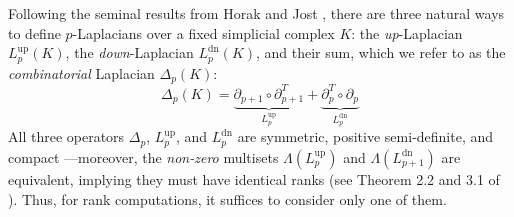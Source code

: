\documentclass[pdflatex,sn-mathphys-num]{sn-jnl}
\begin{document}
Following the seminal results from Horak and Jost \cite{horak2013spectra}, there are three natural ways to define \(p\)-Laplacians over a fixed simplicial complex \(K\): the \emph{up}-Laplacian \(L_{p}^{\operatorname{up}}(K)\), the \emph{down}-Laplacian \(L_{p}^{\operatorname{dn}}(K)\), and their sum, which we refer to as the \emph{combinatorial} Laplacian \(\Delta_{p}(K)\):
\[\label{eq:comb_lap}
\Delta_{p}(K) = \underset{L_{p}^{\operatorname{up}}}{\underbrace{\partial_{p + 1} \circ \partial_{p + 1}^{T}}} + \underset{L_{p}^{\operatorname{dn}}}{\underbrace{\partial_{p}^{T} \circ \partial_{p}}}
\]
\noindent All three operators \(\Delta_{p}\), \(L_{p}^{\operatorname{up}}\), and \(L_{p}^{\operatorname{dn}}\) are symmetric, positive semi-definite, and compact \cite{memoli2022persistent}---moreover, the \emph{non-zero} multisets \(\Lambda \left( L_{p}^{\operatorname{up}} \right) \) and \(\Lambda \left( L_{p + 1}^{\operatorname{dn}} \right) \) are equivalent, implying they must have identical ranks (see Theorem 2.2 and 3.1 of \cite{horak2013spectra}). Thus, for rank computations, it suffices to consider only one of them.
\end{document}
